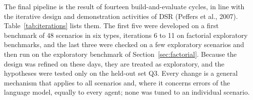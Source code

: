 \documentclass[12pt,a4paper]{report}
\begin{document}
The final pipeline is the result of fourteen build-and-evaluate cycles,
in line with the iterative design and demonstration activities of DSR
(Peffers et al., 2007). Table~\ref{tab:iterations} lists them. The first
five were developed on a first benchmark of 48 scenarios in six types,
iterations 6 to 11 on factorial exploratory benchmarks, and the last
three were checked on a few exploratory scenarios and then run on the
exploratory benchmark of Section~\ref{sec:factorial}. Because the design
was refined on these days, they are treated as exploratory, and the
hypotheses were tested only on the held-out set Q3. Every change is a
general mechanism that applies to all scenarios and, where it concerns
errors of the language model, equally to every agent; none was tuned to
an individual scenario.
\end{document}
